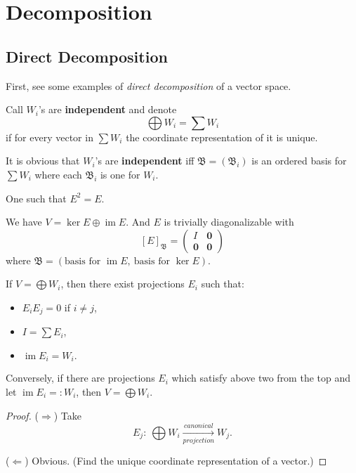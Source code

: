 \chapter{Decomposition}
\section{Direct Decomposition}
First, see some examples of \textit{direct decomposition} of a vector space.
\begin{remind} Call $W_i$'s are \textbf{independent} and denote $$\bigoplus W_i = \sum W_i$$ if for every vector in $\sum W_i$ the coordinate representation of it is unique.
\end{remind}

It is obvious that $W_i$'s are \textbf{independent} iff $\mathfrak B = (\mathfrak B_i)$ is an ordered basis for $\sum W_i$ where each $\mathfrak B_i$ is one for $W_i$.

\begin{remind} One such that $E^2 = E$.
\end{remind}
We have $V = \ker E \oplus \operatorname{im} E.$ And $E$ is trivially diagonalizable with $$[E]_\mathfrak B = \begin{pmatrix}I & \mathbf 0 \\  \mathbf 0 &  \mathbf 0 \end{pmatrix}$$ where $\mathfrak B = (\text{basis for }\operatorname{im} E,~\text{basis for }\operatorname{ker} E).$

\begin{theorem}If $V = \bigoplus W_i$, then there exist projections $E_i$ such that:
\begin{itemize}
\item $E_i E_j = 0$ if $i\ne j$,
\item $I = \sum E_i$,
\item $\operatorname{im} E_i = W_i.$
\end{itemize}
Conversely, if there are projections $E_i$ which satisfy above two from the top and let $\operatorname{im} E_i =: W_i$, then $V = \bigoplus W_i.$
\end{theorem}
\begin{proof}($\Longrightarrow$) Take $$E_j:~\bigoplus W_i\xrightarrow[projection]{canonical} W_j.$$

($\Longleftarrow$) Obvious. (Find the unique coordinate representation of a vector.)
\end{proof}

